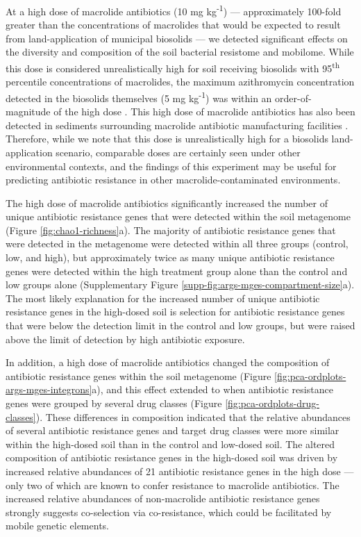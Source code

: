 At a high dose of macrolide antibiotics (10 mg kg\textsuperscript{-1}) --- approximately 100-fold greater than the concentrations of macrolides that would be expected to result from land-application of municipal biosolids --- we detected significant effects on the diversity and composition of the soil bacterial resistome and mobilome.
While this dose is considered unrealistically high for soil receiving biosolids with 95\textsuperscript{th} percentile concentrations of macrolides, the maximum azithromycin concentration detected in the biosolids themselves (5 mg kg\textsuperscript{-1}) was within an order-of-magnitude of the high dose \parencite{U.S.EnvironmentalProtectionAgency.2009}.
This high dose of macrolide antibiotics has also been detected in sediments surrounding macrolide antibiotic manufacturing facilities \parencite{GonzalezPlaza.2019}.
Therefore, while we note that this dose is unrealistically high for a biosolids land-application scenario, comparable doses are certainly seen under other environmental contexts, and the findings of this experiment may be useful for predicting antibiotic resistance in other macrolide-contaminated environments.

The high dose of macrolide antibiotics significantly increased the number of unique antibiotic resistance genes that were detected within the soil metagenome (Figure \ref{fig:chao1-richness}a).
The majority of antibiotic resistance genes that were detected in the metagenome were detected within all three groups (control, low, and high), but approximately twice as many unique antibiotic resistance genes were detected within the high treatment group alone than the control and low groups alone (Supplementary Figure \ref{supp-fig:args-mges-compartment-size}a).
The most likely explanation for the increased number of unique antibiotic resistance genes in the high-dosed soil is selection for antibiotic resistance genes that were below the detection limit in the control and low groups, but were raised above the limit of detection by high antibiotic exposure.

In addition, a high dose of macrolide antibiotics changed the composition of antibiotic resistance genes within the soil metagenome (Figure \ref{fig:pca-ordplots-args-mges-integrons}a), and this effect extended to when antibiotic resistance genes were grouped by several drug classes (Figure \ref{fig:pca-ordplots-drug-classes}).
These differences in composition indicated that the relative abundances of several antibiotic resistance genes and target drug classes were more similar within the high-dosed soil than in the control and low-dosed soil.
The altered composition of antibiotic resistance genes in the high-dosed soil was driven by increased relative abundances of 21 antibiotic resistance genes in the high dose --- only two of which are known to confer resistance to macrolide antibiotics.
The increased relative abundances of non-macrolide antibiotic resistance genes strongly suggests co-selection via co-resistance, which could be facilitated by mobile genetic elements.

